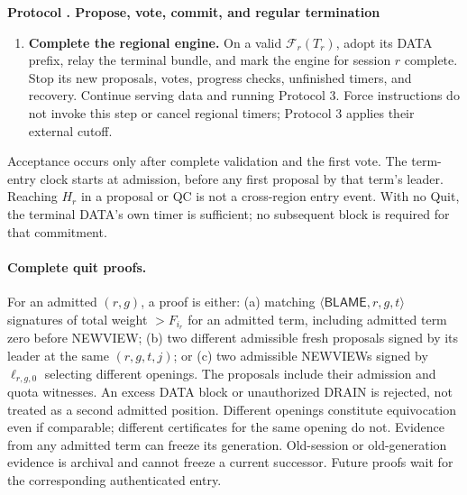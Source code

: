 \documentclass[11pt,a4paper]{article}
\newcommand{\RR}[1]{{\color{rrRed}#1}}
\newcommand{\FC}{\mathcal F}
\newcommand{\tagg}[1]{\ensuremath{\mathsf{#1}}}
\newcounter{protocol}
\newenvironment{protocol}[2]{\refstepcounter{protocol}\label{#1}
\begin{mdframed}[nobreak=true,linewidth=.6pt,skipabove=8pt,skipbelow=8pt,
innertopmargin=7pt,innerbottommargin=7pt]\small
\textbf{Protocol \theprotocol. #2}\par\smallskip}{\end{mdframed}}
\begin{document}
\begin{protocol}{alg:steady}{Propose, vote, commit, and regular termination}
\begin{enumerate}[label=\textbf{\arabic*)},itemsep=5pt]
\item \RR{\textbf{Complete the regional engine.} On a valid $\FC_r(T_r)$,
adopt its DATA prefix, relay the terminal bundle, and mark the engine for
session $r$ complete. Stop its new proposals, votes, progress checks,
unfinished timers, and recovery. Continue serving data and running
Protocol 3. Force instructions do not invoke this step or cancel
regional timers; Protocol 3 applies their external cutoff.}
\end{enumerate}
\end{protocol}

Acceptance occurs only after complete validation and the first vote.
The term-entry clock starts at admission, before any first proposal by
that term's leader. Reaching $H_r$ in a proposal or QC is not a cross-region
entry event. With no Quit, the terminal DATA's own timer is sufficient;
no subsequent block is required for that commitment.

\paragraph{Complete quit proofs.}
For an admitted $(r,g)$, a proof is either: (a) matching
$\langle\tagg{BLAME},r,g,t\rangle$ signatures of total weight
$>F_{i_r}$ for an admitted term, including admitted term zero before
NEWVIEW; (b) two different admissible fresh
proposals signed by its leader at the same $(r,g,t,j)$; or (c) two
admissible NEWVIEWs signed by $\ell_{r,g,0}$ selecting different openings.
The proposals include their admission and quota witnesses. An excess
DATA block or unauthorized DRAIN is rejected, not treated as a second
admitted position. Different openings constitute equivocation even if
comparable; different certificates for the same opening do not.
Evidence from any admitted term can freeze its generation. Old-session
or old-generation evidence is archival and cannot freeze a current
successor. Future proofs wait for the corresponding authenticated entry.
\end{document}
